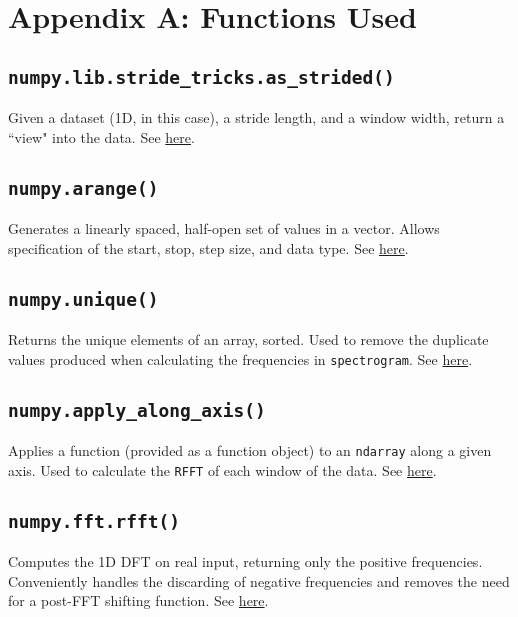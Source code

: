 \documentclass[journal]{IEEEtran}
\def\code#1{\texttt{#1}}
\begin{document}
\newpage
\clearpage
\newpage
\section{Appendix A: Functions Used}
\subsection{\code{numpy.lib.stride\_tricks.as\_strided()}}
Given a dataset (1D, in this case), a stride length, and a window width,
return a ``view" into the data. See \href{https://docs.scipy.org/doc/numpy/reference/generated/numpy.lib.stride_tricks.as_strided.html}{here}.

\subsection{\code{numpy.arange()}}
Generates a linearly spaced, half-open set of values in a vector. Allows specification of the start, stop, step size,
and data type. See \href{https://docs.scipy.org/doc/numpy/reference/generated/numpy.arange.html}{here}.

\subsection{\code{numpy.unique()}}
Returns the unique elements of an array, sorted. Used to remove the duplicate values produced when calculating
the frequencies in \code{spectrogram}. See \href{https://docs.scipy.org/doc/numpy/reference/generated/numpy.unique.html}{here}.

\subsection{\code{numpy.apply\_along\_axis()}}
Applies a function (provided as a function object) to an \code{ndarray} along a given axis. Used
to calculate the \code{RFFT} of each window of the data. See \href{https://docs.scipy.org/doc/numpy/reference/generated/numpy.apply_along_axis.html}{here}.

\subsection{\code{numpy.fft.rfft()}}
Computes the 1D DFT on real input, returning only the positive frequencies. Conveniently handles the discarding
of negative frequencies and removes the need for a post-FFT shifting function.
See \href{https://docs.scipy.org/doc/numpy/reference/generated/numpy.fft.rfft.html}{here}.
\end{document}
